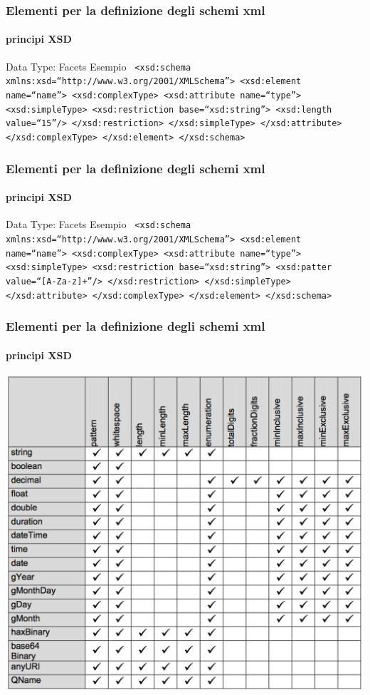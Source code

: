 \begin{frame}
	\frametitle{Elementi per la definizione degli schemi xml}
	\framesubtitle{principi XSD}
	\addtocounter{nframe}{1}

	\begin{block}{Data Type: Facets Esempio}
		\texttt{
			<xsd:schema xmlns:xsd=``http://www.w3.org/2001/XMLSchema''>
			<xsd:element name=``name''>
			<xsd:complexType>
			<xsd:attribute name=``type''>
			<xsd:simpleType>
			<xsd:restriction base=``xsd:string''>
			<xsd:length value=``15''/>
			</xsd:restriction>
			</xsd:simpleType>
			</xsd:attribute>
			</xsd:complexType>
			</xsd:element>
			</xsd:schema>
		}

	\end{block}

\end{frame}

\begin{frame}
	\frametitle{Elementi per la definizione degli schemi xml}
	\framesubtitle{principi XSD}
	\addtocounter{nframe}{1}

	\begin{block}{Data Type: Facets Esempio}
		\texttt{
		<xsd:schema xmlns:xsd=``http://www.w3.org/2001/XMLSchema''>
		<xsd:element name=``name''>
		<xsd:complexType>
		<xsd:attribute name=``type''>
		<xsd:simpleType>
		<xsd:restriction base=``xsd:string''>
		<xsd:patter value=``[A-Za-z]+''/>
		</xsd:restriction>
		</xsd:simpleType>
		</xsd:attribute>
		</xsd:complexType>
		</xsd:element>
		</xsd:schema>
		}

	\end{block}

\end{frame}

\begin{frame}
	\frametitle{Elementi per la definizione degli schemi xml}
	\framesubtitle{principi XSD}
	\addtocounter{nframe}{1}

	\begin{center}
		\includegraphics[width=.8\textwidth]{imgs/SchemaDataTypeFacets.png}
	\end{center}

\end{frame}


